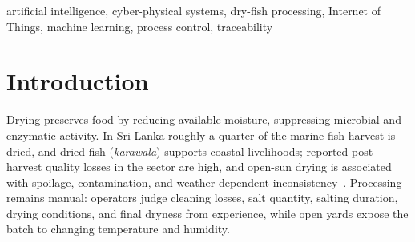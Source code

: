 \documentclass[conference]{IEEEtran}
\begin{document}
\begin{abstract}
Small-scale dry-fish processing in Sri Lanka depends on operator experience
and open-air drying, producing inconsistent quality, spoilage risk, and
fragmented batch histories. Existing work treats environmental monitoring,
machine-learning drying prediction, process control, and traceability as
separate functions, and rarely returns a prediction to the drying equipment
as an operating set-point. This paper presents Smart Karawala, a
batch-centric Artificial Intelligence (AI) and Internet of Things (IoT)
framework that links these functions in one processing lifecycle. A unique
batch identifier ties preparation data, continuous temperature, humidity,
gas and weight sensing, machine-learning prediction of the drying
temperature and duration, rule-based spoilage- and over-drying-risk
assessment, automated drying control, and sustainability records. A
two-phase start protocol turns the predicted parameters into the chamber's
control profile and records a batch as drying only after the chamber
confirms a valid sensor state, and an independent safety layer clamps every
set-point and can stop the heater regardless of the model. On a
physics-informed modelled drying dataset the remaining-time regressor
reached a grouped cross-validated coefficient of determination of 0.96
(mean absolute error 1.1 min). We report the integration status of each
subsystem and the field experiments still required.
\end{abstract}

\begin{IEEEkeywords}
artificial intelligence, cyber-physical systems, dry-fish processing,
Internet of Things, machine learning, process control, traceability
\end{IEEEkeywords}

\section{Introduction}
Drying preserves food by reducing available moisture, suppressing microbial
and enzymatic activity. In Sri Lanka roughly a quarter of the marine fish
harvest is dried, and dried fish (\emph{karawala}) supports coastal
livelihoods; reported post-harvest quality losses in the sector are high,
and open-sun drying is associated with spoilage, contamination, and
weather-dependent inconsistency~\cite{b12}. Processing remains manual:
operators judge cleaning losses, salt quantity, salting duration, drying
conditions, and final dryness from experience, while open yards expose the
batch to changing temperature and humidity.
\end{document}
